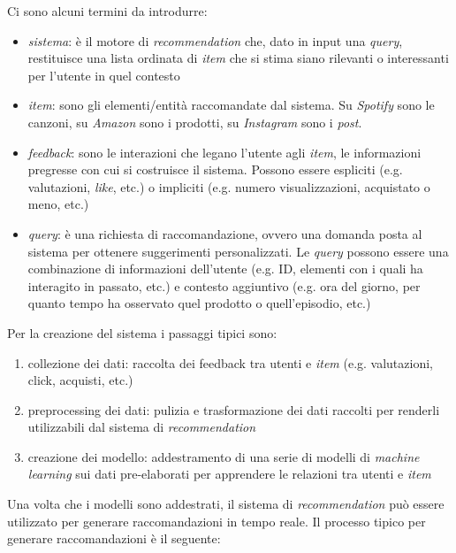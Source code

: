 Ci sono alcuni termini da introdurre:

\begin{itemize}
    \item \textit{sistema}: è il motore di \textit{recommendation} che, dato in input una \textit{query}, restituisce una lista ordinata di \textit{item} che si stima siano rilevanti o interessanti per l'utente in quel contesto
    \item \textit{item}: sono gli elementi/entità raccomandate dal sistema. Su \textit{Spotify} sono le canzoni, su \textit{Amazon} sono i prodotti, su \textit{Instagram} sono i \textit{post}.
    \item \textit{feedback}: sono le interazioni che legano l'utente agli \textit{item}, le informazioni pregresse con cui si costruisce il sistema. Possono essere espliciti (e.g. valutazioni, \textit{like}, etc.) o impliciti (e.g. numero visualizzazioni, acquistato o meno, etc.)
    \item \textit{query}: è una richiesta di raccomandazione, ovvero una domanda posta al sistema per ottenere suggerimenti personalizzati. Le \textit{query} possono essere una combinazione di informazioni dell'utente (e.g. ID, elementi con i quali ha interagito in passato, etc.) e contesto aggiuntivo (e.g. ora del giorno, per quanto tempo ha osservato quel prodotto o quell'episodio, etc.)
\end{itemize}

Per la creazione del sistema i passaggi tipici sono:

\begin{enumerate}
    \item collezione dei dati: raccolta dei feedback tra utenti e \textit{item} (e.g. valutazioni, click, acquisti, etc.)
    \item preprocessing dei dati: pulizia e trasformazione dei dati raccolti per renderli utilizzabili dal sistema di \textit{recommendation}
    \item creazione dei modello: addestramento di una serie di modelli di \textit{machine learning} sui dati pre-elaborati per apprendere le relazioni tra utenti e \textit{item}
\end{enumerate}

Una volta che i modelli sono addestrati, il sistema di \textit{recommendation} può essere utilizzato per generare raccomandazioni in tempo reale. Il processo tipico per generare raccomandazioni è il seguente:

